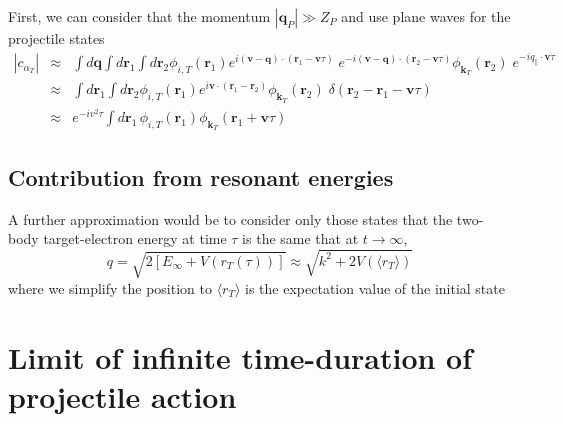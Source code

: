 First, we can consider that the momentum $|\bm{q}_{P}| \gg Z_{P}$ and
use plane waves for the projectile states
\begin{eqnarray} \label{Q:c-alfaT-appro-2}
|c_{\alpha_{T}}| &\approx& \int d \bm{q} \int d \bm{r}_{1} \int
d \bm{r}_{2} \phi_{i,T}(\bm{r}_{1}) e^{i (\bm{v}-\bm{q}) \cdot
(\bm{r}_{1} - \bm{v}\tau)} \; e^{-i (\bm{v}-\bm{q}) \cdot
(\bm{r}_{2} - \bm{v}\tau)} \phi_{\bm{k}_{T}}(\bm{r}_{2}) \;
e^{-i q_{\|}  \cdot \bm{v}\tau} \nonumber \\
&\approx& \int d \bm{r}_{1} \int d \bm{r}_{2}
\phi_{i,T}(\bm{r}_{1}) e^{i \bm{v} \cdot (\bm{r}_{1}-\bm{r}_{2})}
\phi_{\bm{k}_{T}}(\bm{r}_{2}) \;
\delta(\bm{r}_{2}-\bm{r}_{1}-\bm{v}\tau)
\\
&\approx& e^{-i v^{2} \tau} \int d \bm{r}_{1} \,
\phi_{i,T}(\bm{r}_{1}) \phi_{\bm{k}_{T}}(\bm{r}_{1} + \bm{v}\tau)
\end{eqnarray}


\subsection{Contribution from resonant energies}
\label{S:Contr-from-reson-energ}

A further approximation would be to consider only those states that the
two-body target-electron energy at time $\tau$ is the same that at $t
\to \infty$,
\begin{equation}\label{Q:Energ-shift}
q = \sqrt{2 [E_{\infty} + V(r_{T}(\tau))]} \approx \sqrt{k^{2} + 2
V(\langle r_{T} \rangle)}
\end{equation}
%
where we simplify the position to $\langle r_{T}\rangle$ is the
expectation value of the initial state

\section{Limit of infinite time-duration of projectile action}
\label{S:Limit-infin-time--proje-actio}

